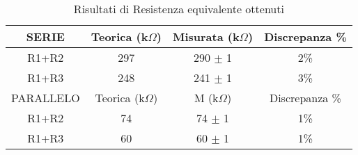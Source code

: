 \begin{table}[H]
    \centering
    \caption{Risultati di Resistenza equivalente ottenuti}
    \begin{tabular}{|c|c|c|c|}
        \hline
        SERIE & Teorica (k$\Omega$) & Misurata (k$\Omega$) & Discrepanza \% \\ \hline
        R1+R2 & 297 & 290 $\pm$ 1 & 2\% \\ 
        R1+R3 & 248 & 241 $\pm$ 1 & 3\% \\ 
        \hline
        PARALLELO & Teorica (k$\Omega$) & M (k$\Omega$) & Discrepanza \% \\ \hline
        R1+R2 & 74 & 74 $\pm$ 1 & 1\% \\ 
        R1+R3 & 60 & 60 $\pm$ 1 & 1\% \\ \hline
    \end{tabular}
    \label{}
\end{table}